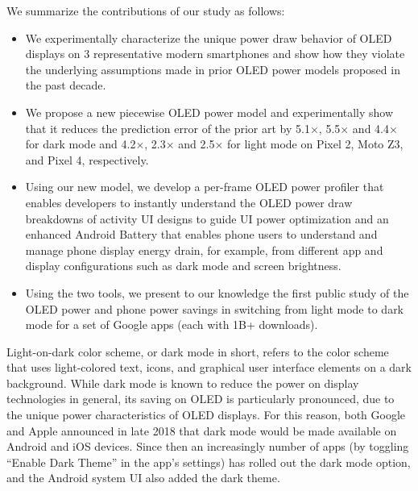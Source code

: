 

We summarize the contributions of our study as follows:
\begin{itemize}[leftmargin=*]
  \item We experimentally characterize the unique power draw behavior
    of OLED displays on 3 representative modern smartphones and show
    how they violate the underlying assumptions made in prior OLED
    power models proposed in the past decade.
  \item We propose a new piecewise OLED power model and experimentally
    show that it reduces the prediction error of the prior art by 
5.1$\times$, 5.5$\times$ and 4.4$\times$ for dark mode
and 4.2$\times$, 2.3$\times$ and 2.5$\times$ for light mode 
    on Pixel 2, Moto Z3, and Pixel 4, respectively.
  \item Using our new model, we develop a per-frame OLED
    power profiler that enables developers to instantly understand the
    OLED power draw breakdowns of activity UI designs to guide UI power optimization and an enhanced Android Battery that enables phone users to
understand and manage phone
display energy drain, for example, from different app and display
configurations such as dark mode and screen brightness.
  \item Using the two tools, we present to our knowledge
    the first public study of the OLED power and phone power
    savings in switching from light mode to dark mode for a
    set of Google apps {(each with 1B+ downloads).}
  \end{itemize}




Light-on-dark color scheme, or dark mode in short, refers to the color
scheme that uses light-colored text, icons, and graphical user
interface elements on a dark background.  While dark mode
is known to reduce the power on display technologies in general,
its saving on OLED is particularly pronounced, due to the unique power
characteristics of OLED displays.  For this reason, both Google and
Apple announced in late 2018 that dark mode would be made available on
Android and iOS devices. Since then an increasingly number of apps
(by toggling ``Enable Dark Theme'' in the app's settings) has rolled out
the dark mode option, and the Android system UI also added the dark
theme.


